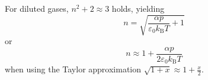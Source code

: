 For diluted gases, $n^2 + 2 \approx 3$ holds, yielding
\begin{equation}
    n = \sqrt{\frac{\alpha p}{\varepsilon_0 k_\text{B} T} + 1}
    \label{eq:LLL}
\end{equation}
or
\begin{equation}
    n \approx 1 + \frac{\alpha p}{2 \varepsilon_0 k_\text{B} T}
    \label{eq:refractiveindexair}
\end{equation}
when using the Taylor approximation $\sqrt{1 + x} \approx 1 + \frac{x}{2}$.




